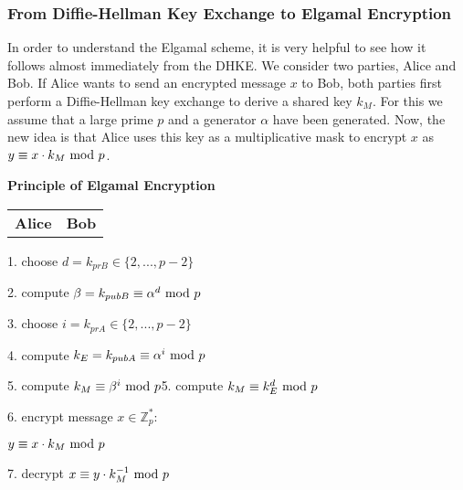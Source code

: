 \subsubsection{From Diffie-Hellman Key Exchange to Elgamal Encryption}
In order to understand the Elgamal scheme, it is very helpful to see how it follows almost immediately from the DHKE. We consider two parties, Alice and Bob. If Alice wants to send an encrypted message $x$ to Bob, both parties first perform a Diffie-Hellman key exchange to derive a shared key $k_M$. For this we assume that a large prime $p$ and a generator $\alpha$ have been generated. Now, the new idea is that Alice uses this key as a multiplicative mask to encrypt $x$ as $y\equiv x\cdot k_M\text{ mod } p$.
\begin{framed}
    \begin{center}
        \textbf{Principle of Elgamal Encryption}\vspace{0.25cm}
        \begin{tabular}{c@{\hskip 10cm}c}
            \textbf{Alice}&\textbf{Bob}
        \end{tabular}
    \end{center}
    
    {\hskip 10.5cm}1. choose $d=k_{prB}\in\{2,...,p-2\}$
    
    {\hskip 10.5cm}2. compute $\beta=k_{pubB}\equiv\alpha^d\text{ mod } p$

    \begin{center}\end{center}
    
    3. choose $i=k_{prA}\in\{2,...,p-2\}$
    
    4. compute $k_E=k_{pubA}\equiv\alpha^i\text{ mod } p$
    
    \begin{center}\end{center}
    
    5. compute $k_M\equiv\beta^i\text{ mod } p${\hskip 5.9cm}5. compute $k_M\equiv k_E^d\text{ mod } p$
    
    6. encrypt message $x\in\mathbb{Z}_p^*$:\vspace{0.1cm}
    
    {\hskip 0.9cm}$y\equiv x\cdot k_M\text{ mod } p$

    \begin{center}\end{center}
    
    {\hskip 10.55cm}7. decrypt $x\equiv y\cdot k_M^{-1}\text{ mod } p$
    
\end{framed}
